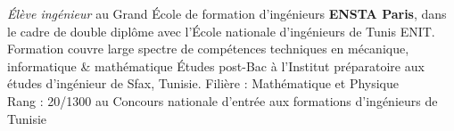 \documentclass[
	a4paper,
]{fortysecondscv}
\begin{document}
\makefrontsidebar

\begin{cvtable}[1.5]
	 {}
		{  {\em \'{E}lève ingénieur} au Grand École de formation d'ingénieurs  \textbf{ENSTA Paris}, dans le cadre de {double diplôme} avec l'École nationale
d'ingénieurs de Tunis ENIT. 
Formation couvre large spectre de compétences techniques en
 mécanique, informatique \& mathématique
}
		{Études post-Bac à l'Institut préparatoire aux études d'ingénieur de Sfax, Tunisie.
  Filière : Mathématique et Physique\\
  {Rang : 20/1300} au Concours nationale d’entrée aux formations d’ingénieurs de Tunisie}
\end{cvtable}
\end{document}
